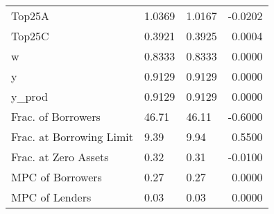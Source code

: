 \begin{table}
\begin{tabular}{lllr}
                  Top25A &  1.0369 &   1.0167 & -0.0202 \\
                  Top25C &  0.3921 &   0.3925 &  0.0004 \\
                       w &  0.8333 &   0.8333 &  0.0000 \\
                       y &  0.9129 &   0.9129 &  0.0000 \\
                  y\_prod &  0.9129 &   0.9129 &  0.0000 \\
      Frac. of Borrowers &   46.71 &    46.11 & -0.6000 \\
Frac. at Borrowing Limit &    9.39 &     9.94 &  0.5500 \\
    Frac. at Zero Assets &    0.32 &     0.31 & -0.0100 \\
        MPC of Borrowers &    0.27 &     0.27 &  0.0000 \\
          MPC of Lenders &    0.03 &     0.03 &  0.0000 \\
\bottomrule
\end{tabular}
\end{table}
